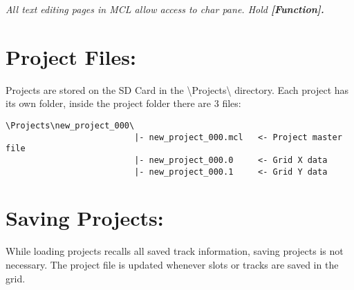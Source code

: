 \textit{All text editing pages in MCL allow access to char pane. Hold \textbf{[Function].}}

\section{Project Files:}
Projects are stored on the SD Card in the \textbackslash{}Projects\textbackslash{} directory.
Each project has its own folder, inside the project folder there are 3 files:
\begin{verbatim}
\Projects\new_project_000\
                          |- new_project_000.mcl   <- Project master file
                          |- new_project_000.0     <- Grid X data
                          |- new_project_000.1     <- Grid Y data
\end{verbatim}

\section{Saving Projects:}
While loading projects recalls all saved track information, saving projects is not necessary. The project file is updated whenever slots or tracks are saved in the grid.